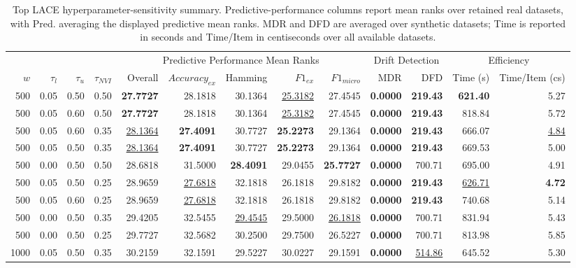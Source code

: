 \begin{table}
\caption{Top LACE hyperparameter-sensitivity summary. Predictive-performance columns report mean ranks over retained real datasets, with Pred. averaging the displayed predictive mean ranks. MDR and DFD are averaged over synthetic datasets; Time is reported in seconds and Time/Item in centiseconds over all available datasets.}
\label{tab:sensitivity_summary}
\begin{tabular}{rrrrrrrrrrrrr}
\toprule
 &  &  &  & \multicolumn{5}{c}{Predictive Performance Mean Ranks} & \multicolumn{2}{c}{Drift Detection} & \multicolumn{2}{c}{Efficiency} \\
\cmidrule(lr){5-9} \cmidrule(lr){10-11} \cmidrule(lr){12-13}
$w$ & $\tau_l$ & $\tau_u$ & $\tau_{NVI}$ & Overall & $Accuracy_{ex}$ & Hamming & $F1_{ex}$ & $F1_{micro}$ & MDR & DFD & Time (s) & Time/Item (cs) \\
\midrule
500 & 0.05 & 0.50 & 0.50 & \textbf{27.7727} & 28.1818 & 30.1364 & \underline{25.3182} & 27.4545 & \textbf{0.0000} & \textbf{219.43} & \textbf{621.40} & 5.27 \\
500 & 0.05 & 0.60 & 0.50 & \textbf{27.7727} & 28.1818 & 30.1364 & \underline{25.3182} & 27.4545 & \textbf{0.0000} & \textbf{219.43} & 818.84 & 5.72 \\
500 & 0.05 & 0.60 & 0.35 & \underline{28.1364} & \textbf{27.4091} & 30.7727 & \textbf{25.2273} & 29.1364 & \textbf{0.0000} & \textbf{219.43} & 666.07 & \underline{4.84} \\
500 & 0.05 & 0.50 & 0.35 & \underline{28.1364} & \textbf{27.4091} & 30.7727 & \textbf{25.2273} & 29.1364 & \textbf{0.0000} & \textbf{219.43} & 669.53 & 5.00 \\
500 & 0.00 & 0.50 & 0.50 & 28.6818 & 31.5000 & \textbf{28.4091} & 29.0455 & \textbf{25.7727} & \textbf{0.0000} & 700.71 & 695.00 & 4.91 \\
500 & 0.05 & 0.50 & 0.25 & 28.9659 & \underline{27.6818} & 32.1818 & 26.1818 & 29.8182 & \textbf{0.0000} & \textbf{219.43} & \underline{626.71} & \textbf{4.72} \\
500 & 0.05 & 0.60 & 0.25 & 28.9659 & \underline{27.6818} & 32.1818 & 26.1818 & 29.8182 & \textbf{0.0000} & \textbf{219.43} & 740.68 & 5.14 \\
500 & 0.00 & 0.50 & 0.35 & 29.4205 & 32.5455 & \underline{29.4545} & 29.5000 & \underline{26.1818} & \textbf{0.0000} & 700.71 & 831.94 & 5.43 \\
500 & 0.00 & 0.50 & 0.25 & 29.7727 & 32.5682 & 30.2500 & 29.7500 & 26.5227 & \textbf{0.0000} & 700.71 & 813.98 & 5.85 \\
1000 & 0.05 & 0.50 & 0.35 & 30.2159 & 32.1591 & 29.5227 & 30.0227 & 29.1591 & \textbf{0.0000} & \underline{514.86} & 645.52 & 5.30 \\
\bottomrule
\end{tabular}
\end{table}
